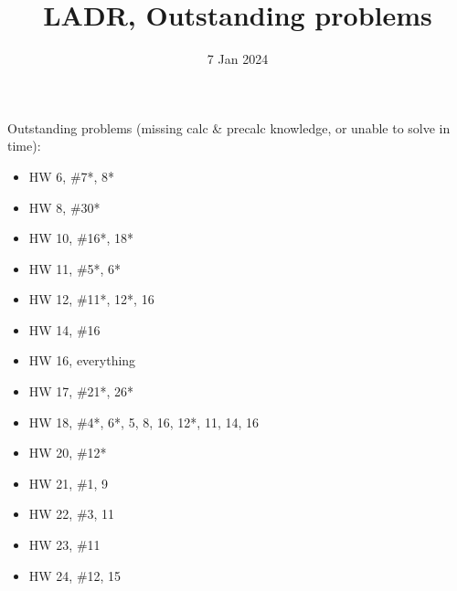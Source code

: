 \documentclass{article}
\title{LADR, Outstanding problems}
\date{7 Jan 2024}
\begin{document}
\maketitle

Outstanding problems (missing calc \& precalc knowledge, or unable to solve in time):

\begin{itemize}
    \item HW 6, \#7*, 8*
    \item HW 8, \#30*
    \item HW 10, \#16*, 18*
    \item HW 11, \#5*, 6*
    \item HW 12, \#11*, 12*, 16
    \item HW 14, \#16
    \item HW 16, everything
    \item HW 17, \#21*, 26*
    \item HW 18, \#4*, 6*, 5, 8, 16, 12*, 11, 14, 16
    \item HW 20, \#12*
    \item HW 21, \#1, 9
    \item HW 22, \#3, 11
    \item HW 23, \#11
    \item HW 24, \#12, 15
\end{itemize}
\end{document}
